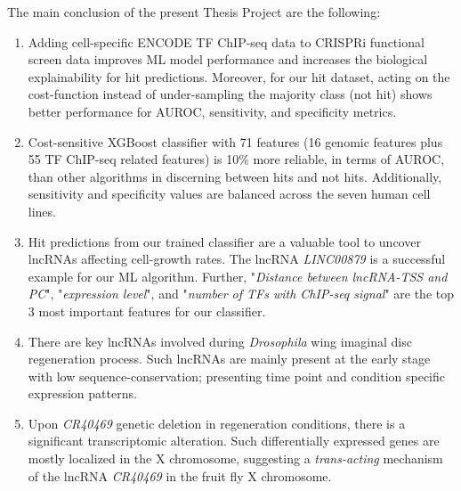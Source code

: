 The main conclusion of the present Thesis Project are the following: 

\begin{enumerate}

\item Adding cell-specific ENCODE TF ChIP-seq data to CRISPRi functional screen data improves ML model performance and increases the biological explainability for hit predictions. Moreover, for our hit dataset, acting on the cost-function instead of under-sampling the majority class (not hit) shows better performance for AUROC, sensitivity, and specificity metrics.

\item Cost-sensitive XGBoost classifier with 71 features (16 genomic features plus 55 TF ChIP-seq related features) is 10\% more reliable, in terms of AUROC, than other algorithms in discerning between hits and not hits. Additionally, sensitivity and specificity values are balanced across the seven human cell lines. 
  
\item Hit predictions from our trained classifier are a valuable tool to uncover lncRNAs affecting cell-growth rates. The lncRNA \textit{LINC00879} is a successful example for our ML algorithm. Further, "\textit{Distance between lncRNA-TSS and PC}", "\textit{expression level}", and "\textit{number of TFs with ChIP-seq signal}" are the top 3 most important features for our classifier.

\item There are key lncRNAs involved during \textit{Drosophila} wing imaginal disc regeneration process. Such lncRNAs are mainly present at the early stage with low sequence-conservation; presenting time point and condition specific expression patterns.

\item Upon \textit{CR40469} genetic deletion in regeneration conditions, there is a significant transcriptomic alteration. Such differentially expressed genes are mostly localized in the X chromosome, suggesting a \textit{trans-acting} mechanism of the lncRNA \textit{CR40469} in the fruit fly X chromosome.  

\end{enumerate}


